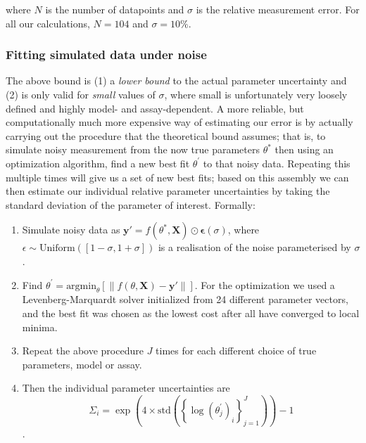 \documentclass[10pt]{amsart}
\begin{document}
	where $N$ is the number of datapoints and $\sigma$ is the relative measurement error. For all our calculations, $N=104$ and $\sigma=10\%$.

	\subsubsection{Fitting simulated data under noise}
	The above bound is (1) a \textit{lower bound} to the actual parameter uncertainty and (2) is only valid for \textit{small} values of $\sigma$, where small is unfortunately very loosely defined and highly model- and assay-dependent. A more reliable, but computationally much more expensive way of estimating our error is by actually carrying out the procedure that the theoretical bound assumes; that is, to simulate noisy measurement from the now true parameters $\theta^*$ then using an optimization algorithm, find a new best fit $\theta^{'}$ to that noisy data. Repeating this multiple times will give us a set of new best fits; based on this assembly we can then estimate our individual relative parameter uncertainties by taking the standard deviation of the parameter of interest. Formally:
	\begin{enumerate}
		\item Simulate noisy data as $\mathbf{y'} = f(\theta^*, \mathbf{X})\odot\mathbf{\epsilon}(\sigma)$, where $\epsilon \sim \textrm{Uniform}([1-\sigma, 1+\sigma])$ is a realisation of the noise parameterised by $\sigma$.
		\item Find $\theta^{'} = \textrm{argmin}_\theta \left[ \|f(\theta, \mathbf{X}) - \mathbf{y'}\|\right]$. For the optimization we used a Levenberg-Marquardt solver initialized from 24 different parameter vectors, and the best fit was chosen as the lowest cost after all have converged to local minima.
		\item Repeat the above procedure $J$ times for each different choice of true parameters, model or assay.
		\item Then the individual parameter uncertainties are $$\Sigma_i =  \exp\left(4\times \textrm{std}\left(\left\{\log\left(\theta^{'}_j\right)_i\right\}_{j=1}^J\right) \right) - 1$$. 
	\end{enumerate}
\end{document}
